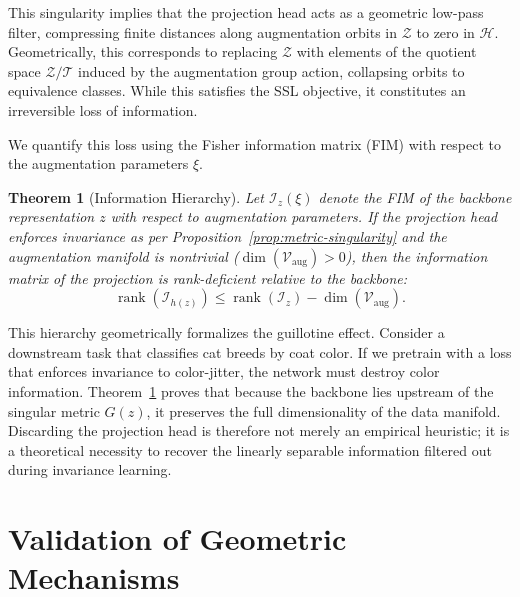 \documentclass{article}
\theoremstyle{plain}
\newtheorem{theorem}{Theorem}[section]
\theoremstyle{definition}
\theoremstyle{remark}
\begin{document}
This singularity implies that the projection head acts as a geometric low-pass filter, compressing finite distances along augmentation orbits in $\mathcal{Z}$ to zero in $\mathcal{H}$. Geometrically, this corresponds to replacing $\mathcal{Z}$ with elements of the quotient space $\mathcal{Z} / \mathcal{T}$ induced by the augmentation group action, collapsing orbits to equivalence classes. While this satisfies the SSL objective, it constitutes an irreversible loss of information.

We quantify this loss using the Fisher information matrix (FIM) with respect to the augmentation parameters $\xi$.

\begin{theorem}[Information Hierarchy]
\label{thm:information-hierarchy}
Let $\mathcal{I}_z(\xi)$ denote the FIM of the backbone representation $z$ with respect to augmentation parameters. If the projection head enforces invariance as per Proposition~\ref{prop:metric-singularity} and the augmentation manifold is nontrivial ($\dim(\mathcal{V}_{\text{aug}}) > 0$), then the information matrix of the projection is rank-deficient relative to the backbone:
\begin{equation*}
    \operatorname{rank}(\mathcal{I}_{h(z)}) \le \operatorname{rank}(\mathcal{I}_z) - \dim(\mathcal{V}_{\text{aug}}).
\end{equation*}
\end{theorem}

This hierarchy geometrically formalizes the guillotine effect. Consider a downstream task that classifies cat breeds by coat color. If we pretrain with a loss that enforces invariance to color-jitter, the network must destroy color information. Theorem~\ref{thm:information-hierarchy} proves that because the backbone lies upstream of the singular metric $G(z)$, it preserves the full dimensionality of the data manifold. Discarding the projection head is therefore not merely an empirical heuristic; it is a theoretical necessity to recover the linearly separable information filtered out during invariance learning.

\section{Validation of Geometric Mechanisms}
\label{sec:experiments}

\end{document}
